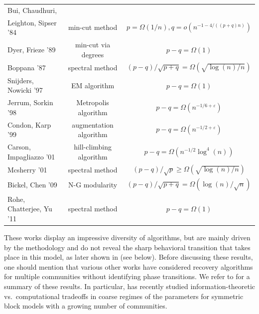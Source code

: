 \documentclass[11pt]{article}
\newcommand{\e}{\varepsilon}
\newcommand{\1}{\mathbb{1}}
\begin{document}
\begin{small}
\begin{center}
  \begin{tabular}{| l |  c |c   | }
  \hline
Bui, Chaudhuri,  && \\
Leighton, Sipser '84  & min-cut method& $p = \Omega(1/n), q=o(n^{-1-4/((p+q)n)})$\\
  \hline
Dyer, Frieze '89  & min-cut via degrees & $p -q = \Omega(1)$\\
  \hline
Boppana '87  & spectral method & $(p -q)/\sqrt{p+q} = \Omega(\sqrt{\log(n)/n})$\\
  \hline
Snijders, Nowicki '97  & EM algorithm & $p -q = \Omega(1)$\\
\hline
Jerrum, Sorkin '98  &Metropolis algorithm & $p -q= \Omega(n^{-1/6+\e})$\\
   \hline
Condon, Karp '99 & augmentation algorithm & $p -q= \Omega(n^{-1/2+\e})$\\
  \hline
Carson, Impagliazzo '01  & hill-climbing algorithm & $p-q= \Omega(n^{-1/2} \log^4(n))$\\
 \hline
Mcsherry '01  & spectral method & $(p - q)/\sqrt{p} \geq \Omega (\sqrt{\log(n)/n })$\\
 \hline
Bickel, Chen '09  & N-G modularity & $(p -q)/\sqrt{p+q} = \Omega(\log(n)/\sqrt{n})$\\
 \hline
Rohe, Chatterjee, Yu '11  & spectral method & $p -q= \Omega(1)$\\
\hline
  \end{tabular}
\end{center}
\end{small}
These works display an impressive diversity of algorithms, but are mainly driven by the methodology and do not reveal the sharp behavioral transition that takes place in this model, as later shown in \cite{abh,mossel-consist} (see below). Before discussing these results, one should mention that various other works have considered recovery algorithms for multiple communities without identifying phase transitions. We refer to \cite{sbm-algos,chen-xu} for a summary of these results. In particular, \cite{chen-xu} has recently studied information-theoretic vs.\ computational tradeoffs in coarse regimes of the parameters for symmetric block models with a growing number of communities. 
\end{document}
